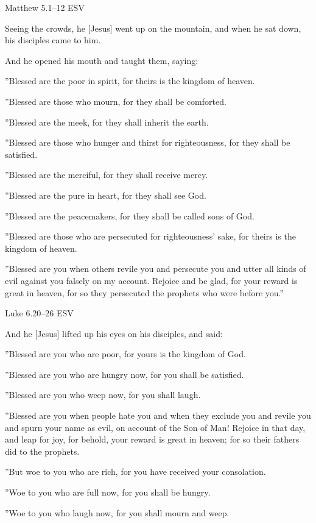 \documentclass[
]{article}
\newcommand{\RL}[1]{\beginR #1\endR}
\begin{document}
Matthew 5.1--12 ESV

Seeing the crowds, he {[}Jesus{]} went up on the mountain, and when he
sat down, his disciples came to him.

And he opened his mouth and taught them, saying:

\RL{''}Blessed are the poor in spirit, for theirs is the kingdom of
heaven.

\RL{''}Blessed are those who mourn, for they shall be comforted.

\RL{''}Blessed are the meek, for they shall inherit the earth.

\RL{''}Blessed are those who hunger and thirst for righteousness, for
they shall be satisfied.

\RL{''}Blessed are the merciful, for they shall receive mercy.

\RL{''}Blessed are the pure in heart, for they shall see God.

\RL{''}Blessed are the peacemakers, for they shall be called sons of
God.

\RL{''}Blessed are those who are persecuted for righteousness\RL{'}
sake, for theirs is the kingdom of heaven.

\RL{''}Blessed are you when others revile you and persecute you and
utter all kinds of evil against you falsely on my account. Rejoice and
be glad, for your reward is great in heaven, for so they persecuted the
prophets who were before you.''

Luke 6.20--26 ESV

And he {[}Jesus{]} lifted up his eyes on his disciples, and said:

\RL{''}Blessed are you who are poor, for yours is the kingdom of God.

\RL{''}Blessed are you who are hungry now, for you shall be satisfied.

\RL{''}Blessed are you who weep now, for you shall laugh.

\RL{''}Blessed are you when people hate you and when they exclude you
and revile you and spurn your name as evil, on account of the Son of
Man! Rejoice in that day, and leap for joy, for behold, your reward is
great in heaven; for so their fathers did to the prophets.

\RL{''}But woe to you who are rich, for you have received your
consolation.

\RL{''}Woe to you who are full now, for you shall be hungry.

\RL{''}Woe to you who laugh now, for you shall mourn and weep.
\end{document}
